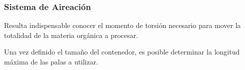 \subsubsection{Sistema de Aireación }

Resulta indispensable conocer el momento de torsión necesario para mover la totalidad de la materia orgánica a procesar.

Una vez definido el tamaño del contenedor, es posible determinar la longitud máxima de las palas a utilizar.
















